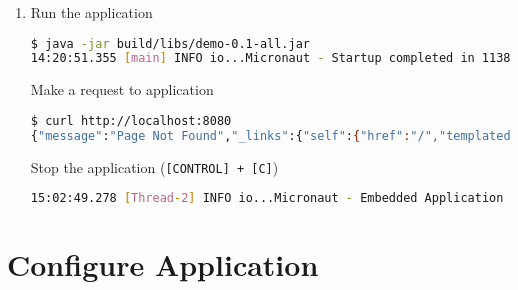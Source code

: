 \documentclass[12pt, letterpaper]{article}
\begin{document}
\begin{enumerate}
    \item{ Run the application

      \begin{lstlisting}[language=bash]
$ java -jar build/libs/demo-0.1-all.jar
14:20:51.355 [main] INFO io...Micronaut - Startup completed in 1138ms. Server Running: http://localhost:8080
      \end{lstlisting}

      Make a request to application

      \begin{lstlisting}[language=bash]
$ curl http://localhost:8080
{"message":"Page Not Found","_links":{"self":{"href":"/","templated":false}}}
      \end{lstlisting}

      Stop the application (\texttt{[CONTROL] + [C]})

      \begin{lstlisting}[language=bash]
15:02:49.278 [Thread-2] INFO io...Micronaut - Embedded Application shutting down
      \end{lstlisting}
    }
  \end{enumerate}

\section{Configure Application}
\end{document}
